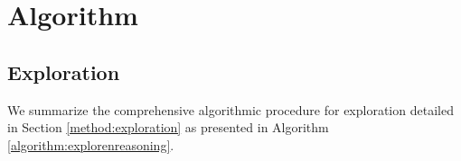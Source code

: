 

\appendix

\section{Algorithm}

\subsection{Exploration}\label{appendix:alg:explora}
We summarize the comprehensive algorithmic procedure for exploration detailed in Section \ref{method:exploration} as presented in Algorithm \ref{algorithm:explorenreasoning}.

